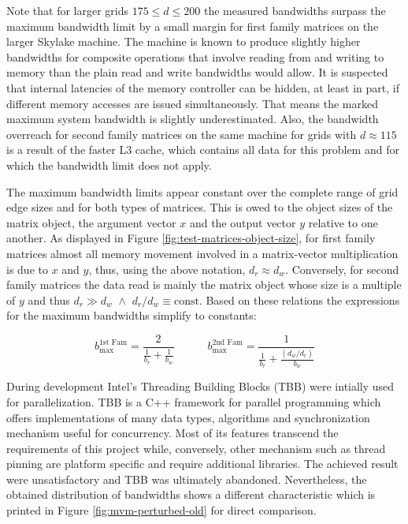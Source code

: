      Note that for larger grids $175 \leq d \leq 200$ the measured bandwidths surpass the maximum bandwidth limit by a
     small margin for first family matrices on the larger Skylake machine. The machine is known to produce slightly
     higher bandwidths for composite operations that involve reading from and writing to memory than the plain read and
     write bandwidths would allow. It is suspected that internal latencies of the memory controller can be hidden, at
     least in part, if different memory accesses are issued simultaneously. That means the marked maximum system
     bandwidth is slightly underestimated. Also, the bandwidth overreach for second family matrices on the same machine
     for grids with $d \approx 115$ is a result of the faster L3 cache, which contains all data for this problem and for
     which the bandwidth limit does not apply.
 
     The maximum bandwidth limits appear constant over the complete range of grid edge sizes and for both types of
     matrices. This is owed to the object sizes of the matrix object, the argument vector $x$ and the output vector $y$
     relative to one another. As displayed in Figure \ref{fig:test-matrices-object-size}, for first family matrices
     almost all memory movement involved in a matrix-vector multiplication is due to $x$ and $y$, thus, using the above
     notation, $d_r \approx d_w$. Conversely, for second family matrices the data read is mainly the matrix object whose
     size is a multiple of $y$ and thus $d_r \gg d_w \,\, \land \,\, d_r/d_w \equiv \text{const}$. Based on these
     relations the expressions for the maximum bandwidths simplify to constants:
 
     $$
       b_{\text{max}}^{\text{1st Fam}} = \frac{2}{\frac{1}{b_r} + \frac{1}{b_w}} \quad \quad \quad
       b_{\text{max}}^{\text{2nd Fam}} = \frac{1}{\frac{1}{b_r} + \frac{(d_w/d_r)}{b_w}}
     $$
 
     During development Intel's Threading Building Blocks (TBB) \cite{tbb:github} were intially used for parallelization.
     TBB is a C++ framework for parallel programming which offers implementations of many data types, algorithms and
     synchronization mechanism useful for concurrency. Most of its features transcend the requirements of this project
     while, conversely, other mechanism such as thread pinning are platform specific and require additional libraries.
     The achieved result were unsatisfactory and TBB was ultimately abandoned. Nevertheless, the obtained distribution of
     bandwidths shows a different characteristic which is printed in Figure \ref{fig:mvm-perturbed-old} for direct
     comparison.
 

